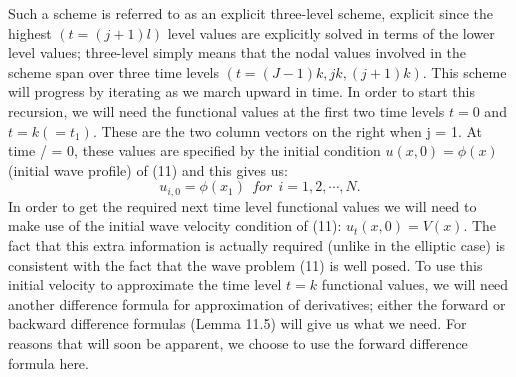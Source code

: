 \documentclass[../main.tex]{subfiles}
\begin{document}
{{Such a scheme is referred to as an explicit three-level scheme, explicit since the 
highest $(t = (j + 1) l) $ level values are explicitly solved in terms of the lower level 
values; three-level simply means that the nodal values involved in the scheme span 
over three time levels $(t = (J -1)k,jk, (j + 1)k)$. This scheme will progress by 
iterating as we march upward in time. In order to start this recursion, we will 
need the functional values at the first two time levels $t = 0$ and $t = k( = t_1)$. These 
are the two column vectors on the right when j = 1. At time / = 0, these values are specified by the initial condition $u(x,0) = \phi(x)$ (initial wave profile) of (11) and this gives us:
 \begin{equation}
	u_{i,0} =\phi(x_1) ~~for ~~i=1,2,\cdots,N.
\end{equation}
In order to get the required next time level functional values we will need to make 
use of the initial wave velocity condition of (11): $u_t(x,0) = V(x)$. The fact that 
this extra information is actually required (unlike in the elliptic case) is consistent with the fact that the wave problem (11) is well posed. To use this initial velocity to approximate the time level $t = k$ functional values, we will need another difference formula for approximation of derivatives; either the forward or backward difference formulas (Lemma 11.5) will give us what we need. For reasons that will soon be apparent, we choose to use the forward difference 
formula here. 

}}
\end{document}

